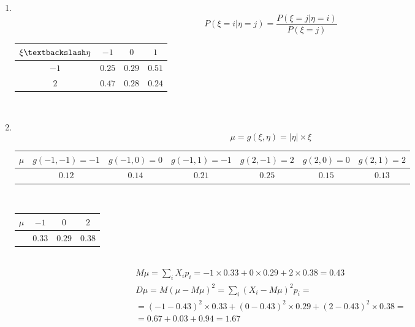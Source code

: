 \documentclass[12pt]{article}
\begin{document}
\begin{enumerate}
	\item \mbox{}\\
	      \begin{equation*}
		      P(\xi = i|\eta = j) = \frac{P(\xi = j|\eta = i)}{P(\xi = j)}
	      \end{equation*}
	      \begin{tabular}{|c|c|c|c|}
		      \hline
		      $\xi \textbackslash \eta$ & $-1$   & $0$    & $1$    \\
		      \hline
		      $-1$                      & $0.25$ & $0.29$ & $0.51$ \\
		      \hline
		      $2$                       & $0.47$ & $0.28$ & $0.24$ \\
		      \hline
	      \end{tabular} \\

	\item \mbox{}\\
	      \[\mu = g(\xi, \eta) = |\eta| \times \xi\]
	      \begin{tabular}{|c|c|c|c|c|c|c|}
		      \hline
		      $\mu$ & $g(-1, -1) = -1$ & $g(-1, 0) = 0$ & $g(-1, 1) = -1$ & $g(2, -1) = 2$ & $g(2, 0) = 0$ & $g(2, 1) = 2$ \\
		      \hline
		            & $0.12$           & $0.14$         & $0.21$          & $0.25$         & $0.15$        & $0.13$        \\
		      \hline
	      \end{tabular} \\
	      \begin{tabular}{|c|c|c|c|}
		      \hline
		      $\mu$ & $-1$   & $0$    & $2$    \\
		      \hline
		            & $0.33$ & $0.29$ & $0.38$ \\
		      \hline
	      \end{tabular} \\
	      \begin{gather*}
		      M\mu = \sum_iX_ip_i = -1 \times 0.33 + 0 \times 0.29 + 2 \times 0.38 = 0.43 \\
		      D\mu = M(\mu - M\mu)^2 = \sum_i\left(X_i-M\mu\right)^2p_i = \\
		      = (-1 - 0.43)^2 \times 0.33 + (0 - 0.43)^2 \times 0.29 + (2 - 0.43)^2 \times 0.38 = \\
		      = 0.67 + 0.03 + 0.94 = 1.67
	      \end{gather*}


\end{enumerate}
\end{document}
